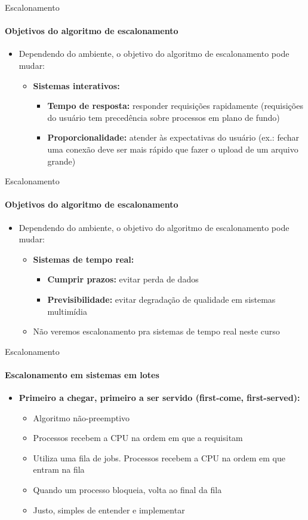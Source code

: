 \documentclass{beamer}
\begin{document}
\begin{frame}{Escalonamento}
	\framesubtitle{Objetivos do algoritmo de escalonamento}
	\begin{itemize}
		\item Dependendo do ambiente, o objetivo do algoritmo de escalonamento pode mudar:
		\begin{itemize}
			\item \textbf{Sistemas interativos:}
			\begin{itemize}
				\item \textbf{Tempo de resposta:} responder requisições rapidamente (requisições do usuário tem precedência sobre processos em plano de fundo)
				\item \textbf{Proporcionalidade:} atender às expectativas do usuário (ex.: fechar uma conexão deve ser mais rápido que fazer o upload de um arquivo grande)
			\end{itemize}
		\end{itemize}
	\end{itemize}
\end{frame}
\begin{frame}{Escalonamento}
	\framesubtitle{Objetivos do algoritmo de escalonamento}
	\begin{itemize}
		\item Dependendo do ambiente, o objetivo do algoritmo de escalonamento pode mudar:
		\begin{itemize}
			\item \textbf{Sistemas de tempo real:}
			\begin{itemize}
				\item \textbf{Cumprir prazos:} evitar perda de dados
				\item \textbf{Previsibilidade:} evitar degradação de qualidade em sistemas multimídia
			\end{itemize}
			\item Não veremos escalonamento pra sistemas de tempo real neste curso
		\end{itemize}
	\end{itemize}
\end{frame}
\begin{frame}{Escalonamento}
	\framesubtitle{Escalonamento em sistemas em lotes}
	\begin{itemize}
		\item \textbf{Primeiro a chegar, primeiro a ser servido (first-come, first-served):}
		\begin{itemize}
			\item Algoritmo não-preemptivo
			\item Processos recebem a CPU na ordem em que a requisitam
			\item Utiliza uma fila de jobs. Processos recebem a CPU na ordem em que entram na fila
			\item Quando um processo bloqueia, volta ao final da fila
			\item Justo, simples de entender e implementar
		\end{itemize}
	\end{itemize}
\end{frame}
\end{document}
